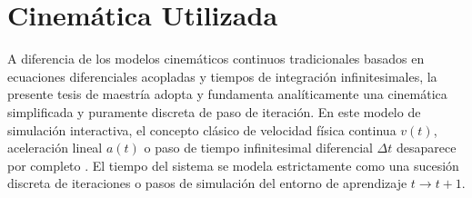 \section{Cinemática Utilizada}
A diferencia de los modelos cinemáticos continuos tradicionales basados en ecuaciones diferenciales acopladas y tiempos de integración infinitesimales, la presente tesis de maestría adopta y fundamenta analíticamente una cinemática simplificada y puramente discreta de paso de iteración. En este modelo de simulación interactiva, el concepto clásico de velocidad física continua $v(t)$, aceleración lineal $a(t)$ o paso de tiempo infinitesimal diferencial $\Delta t$ desaparece por completo \citep{robot.py}. El tiempo del sistema se modela estrictamente como una sucesión discreta de iteraciones o pasos de simulación del entorno de aprendizaje $t \to t+1$.

